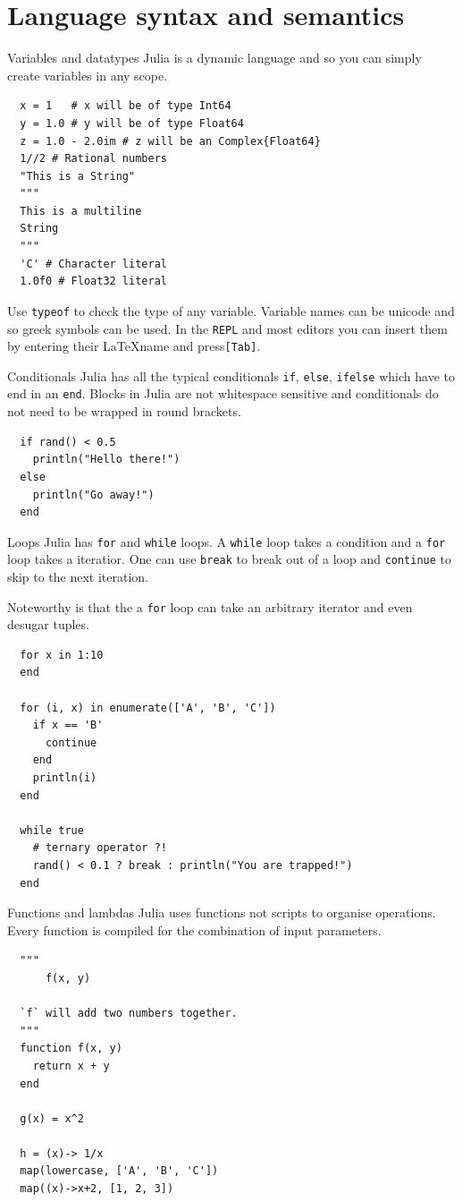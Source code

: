 \documentclass{beamer}
\begin{document}
\section{Language syntax and semantics}
\begin{frame}[fragile]{Variables and datatypes}
  Julia is a dynamic language and so you can simply create variables in any scope.
  \begin{Verbatim}
  x = 1   # x will be of type Int64
  y = 1.0 # y will be of type Float64
  z = 1.0 - 2.0im # z will be an Complex{Float64}
  1//2 # Rational numbers
  "This is a String"
  """
  This is a multiline
  String
  """
  'C' # Character literal
  1.0f0 # Float32 literal
  \end{Verbatim}
  Use \verb|typeof| to check the type of any variable. Variable names can be unicode and so greek symbols can be used.
  In the \verb|REPL| and most editors you can insert them by entering their \LaTeX name and press\verb|[Tab]|.
\end{frame}
\begin{frame}[fragile]{Conditionals}
  Julia has all the typical conditionals \verb|if|, \verb|else|, \verb|ifelse| which have to end in an \verb|end|.
  Blocks in Julia are not whitespace sensitive and conditionals do not need to be wrapped in round brackets.

  \begin{Verbatim}
  if rand() < 0.5
    println("Hello there!")
  else
    println("Go away!")
  end
  \end{Verbatim}

\end{frame}
\begin{frame}[fragile]{Loops}
  Julia has \verb|for| and \verb|while| loops. A \verb|while| loop takes a condition and a \verb|for| loop takes a iteratior.
  One can use \verb|break| to break out of a loop and \verb|continue| to skip to the next iteration.

  Noteworthy is that the a \verb|for| loop can take an arbitrary iterator and even desugar tuples.
  \begin{Verbatim}
  for x in 1:10
  end

  for (i, x) in enumerate(['A', 'B', 'C'])
    if x == 'B'
      continue
    end
    println(i)
  end

  while true
    # ternary operator ?!
    rand() < 0.1 ? break : println("You are trapped!")
  end
  \end{Verbatim}
\end{frame}
\begin{frame}[fragile]{Functions and lambdas}
  Julia uses functions not scripts to organise operations. Every function is compiled for the combination of input parameters.
  \begin{Verbatim}
  """
      f(x, y)

  `f` will add two numbers together.
  """
  function f(x, y)
    return x + y
  end

  g(x) = x^2

  h = (x)-> 1/x
  map(lowercase, ['A', 'B', 'C'])
  map((x)->x+2, [1, 2, 3])
  \end{Verbatim}
\end{frame}
\end{document}

